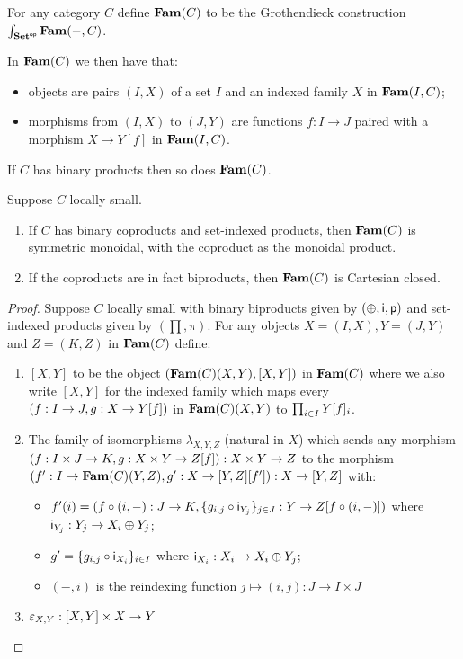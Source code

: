 \begin{definition}
For any category $C$ define $\mathbf{Fam}(C)$ to be the Grothendieck construction
$\int_{\mathbf{Set}^{\mathsf{op}}}\mathbf{Fam}(-,C)$.
\end{definition}

In $\mathbf{Fam}(C)$ we then have that:
\begin{itemize}
\item objects are pairs $(I, X)$ of a set $I$ and an indexed family $X$ in $\mathbf{Fam}(I,C)$;
\item morphisms from $(I, X)$ to $(J, Y)$ are functions $f: I \to J$ paired with a morphism $X \to Y[f]$ in
$\mathbf{Fam}(I,C)$.
\end{itemize}

\begin{proposition}
If $C$ has binary products then so does $\mathbf{Fam}(C)$.
\end{proposition}

\begin{proposition}
Suppose $C$ locally small.
\begin{enumerate}
\item If $C$ has binary coproducts and set-indexed products, then $\mathbf{Fam}(C)$ is symmetric monoidal, with the
coproduct as the monoidal product.
\item If the coproducts are in fact biproducts, then $\mathbf{Fam}(C)$ is Cartesian closed.
\end{enumerate}
\end{proposition}

\begin{proof}
Suppose $C$ locally small with binary biproducts given by $(\oplus,\mathsf{i},\mathsf{p})$ and set-indexed products
given by $(\prod,\pi)$. For any objects $X = (I, X), Y = (J, Y)$ and $Z = (K, Z)$ in $\mathbf{Fam}(C)$ define:

\begin{enumerate}
\item $[X, Y]$ to be the object $(\mathbf{Fam}(C)(X,Y),[X, Y])$ in $\mathbf{Fam}(C)$ where we also write $[X,Y]$ for the
indexed family which maps every $(f: I \to J, g: X \to Y[f])$ in $\mathbf{Fam}(C)(X,Y)$ to $\prod_{i \in
I}Y[f]_i$.
\item The family of isomorphisms $\lambda_{X,Y,Z}$ (natural in $X$) which sends any morphism $(f: I \times J
\to K, g: X \times Y \to Z[f]): X \times Y \to Z$ to the morphism $(f': I \to \mathbf{Fam}(C)(Y,Z), g': X
\to [Y, Z][f']): X \to [Y, Z]$ with:
\begin{itemize}
\item $f'(i) = (f \circ (i, -): J \to K, \{g_{i,j} \circ \mathsf{i}_{Y_j}\}_{j \in J}: Y \to Z[f \circ (i,
-)])$ where $\mathsf{i}_{Y_j}: Y_j \to X_i \oplus Y_j$;
\item $g' = \{g_{i, j} \circ \mathsf{i}_{X_i} \}_{i \in I}$ where $\mathsf{i}_{X_i}: X_i \to X_i \oplus Y_j$;
\item $(-, i)$ is the reindexing function $j \mapsto (i, j): J \to I \times J$
\end{itemize}
\item $\varepsilon_{X,Y}: [X, Y] \times X \to Y$
\end{enumerate}
\end{proof}
